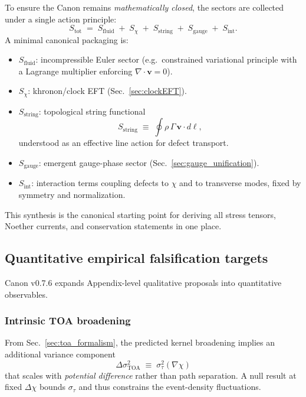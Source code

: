 \documentclass[10pt]{article}
\begin{document}
To ensure the Canon remains \emph{mathematically closed}, the sectors are collected under a single
action principle:
\begin{equation}
S_{\mathrm{tot}} \;=\; S_{\mathrm{fluid}} \;+\; S_{\chi} \;+\; S_{\mathrm{string}} \;+\; S_{\mathrm{gauge}} \;+\; S_{\mathrm{int}}.
\end{equation}
A minimal canonical packaging is:
\begin{itemize}
\item $S_{\mathrm{fluid}}$: incompressible Euler sector (e.g.\ constrained variational principle with a Lagrange multiplier enforcing $\nabla\cdot\mathbf{v}=0$).
\item $S_{\chi}$: khronon/clock EFT (Sec.~\ref{sec:clockEFT}).
\item $S_{\mathrm{string}}$: topological string functional
\begin{equation}
S_{\mathrm{string}}\;\equiv\;\oint \rho\,\Gamma\,\mathbf{v}\cdot d\boldsymbol{\ell},
\end{equation}
understood as an effective line action for defect transport.
\item $S_{\mathrm{gauge}}$: emergent gauge-phase sector (Sec.~\ref{sec:gauge_unification}).
\item $S_{\mathrm{int}}$: interaction terms coupling defects to $\chi$ and to transverse modes, fixed by symmetry and normalization.
\end{itemize}
This synthesis is the canonical starting point for deriving all stress tensors, Noether currents,
and conservation statements in one place.

\subsection{Quantitative empirical falsification targets}
\label{sec:quant_falsifiers}

Canon v0.7.6 expands Appendix-level qualitative proposals into quantitative observables.

\subsubsection{Intrinsic TOA broadening}
From Sec.~\ref{sec:toa_formalism}, the predicted kernel broadening implies an additional variance
component
\begin{equation}
\Delta\sigma_{\mathrm{TOA}}^2 \;\equiv\; \sigma_\tau^2(\nabla\chi)
\end{equation}
that scales with \emph{potential difference} rather than path separation. A null result at fixed
$\Delta\chi$ bounds $\sigma_\tau$ and thus constrains the event-density fluctuations.
\end{document}
